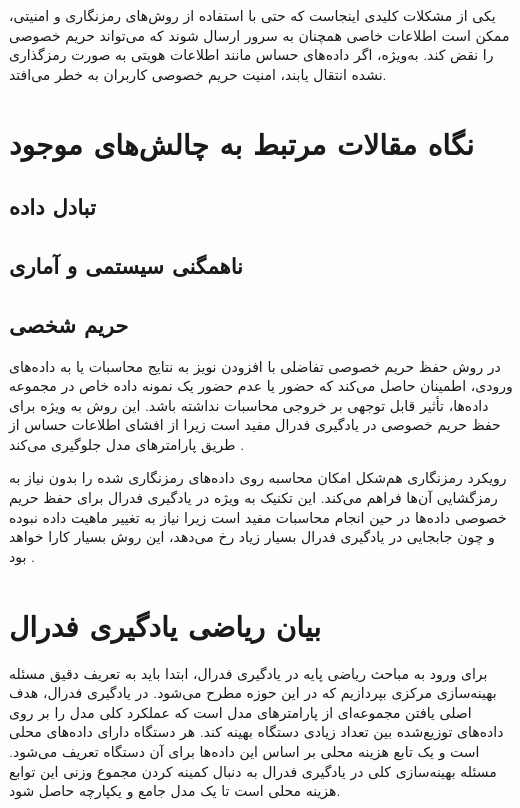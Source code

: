یکی از مشکلات کلیدی اینجاست که حتی با استفاده از روش‌های رمزنگاری و امنیتی، ممکن است اطلاعات خاصی همچنان به سرور ارسال شوند که می‌تواند حریم خصوصی را نقض کند. به‌ویژه، اگر داده‌های حساس مانند اطلاعات هویتی به صورت رمزگذاری نشده انتقال یابند، امنیت حریم خصوصی کاربران به خطر می‌افتد.


\section{نگاه مقالات مرتبط به چالش‌های موجود}

\subsection{تبادل داده}

\subsection{ناهمگنی سیستمی و آماری}

\subsection{حریم شخصی}
در روش حفظ حریم خصوصی تفاضلی%
با افزودن نویز به نتایج محاسبات یا به داده‌های ورودی، اطمینان حاصل می‌کند که حضور یا عدم حضور یک نمونه داده خاص در مجموعه داده‌ها، تأثیر قابل توجهی بر خروجی محاسبات نداشته باشد. این روش به ویژه برای حفظ حریم خصوصی در یادگیری فدرال مفید است زیرا از افشای اطلاعات حساس از طریق پارامترهای مدل جلوگیری می‌کند
\cite{hasan2023security}.

رویکرد رمزنگاری هم‌شکل%
امکان محاسبه روی داده‌های رمزنگاری شده را بدون نیاز به رمزگشایی آن‌ها فراهم می‌کند. این تکنیک به ویژه در یادگیری فدرال برای حفظ حریم خصوصی داده‌ها در حین انجام محاسبات مفید است زیرا نیاز به تغییر ماهیت داده نبوده و چون جابجایی در یادگیری فدرال بسیار زیاد رخ می‌دهد، این روش بسیار کارا خواهد بود
\cite{yin2021comprehensive}.



\section{بیان ریاضی یادگیری فدرال}
برای ورود به مباحث ریاضی پایه در یادگیری فدرال، ابتدا باید به تعریف دقیق مسئله بهینه‌سازی مرکزی بپردازیم که در این حوزه مطرح می‌شود. در یادگیری فدرال، هدف اصلی یافتن مجموعه‌ای از پارامترهای مدل است که عملکرد کلی مدل را بر روی داده‌های توزیع‌شده بین تعداد زیادی دستگاه بهینه کند. هر دستگاه دارای داده‌های محلی است و یک تابع هزینه محلی بر اساس این داده‌ها برای آن دستگاه تعریف می‌شود. مسئله بهینه‌سازی کلی در یادگیری فدرال به دنبال کمینه کردن مجموع وزنی این توابع هزینه محلی است تا یک مدل جامع و یکپارچه حاصل شود.

